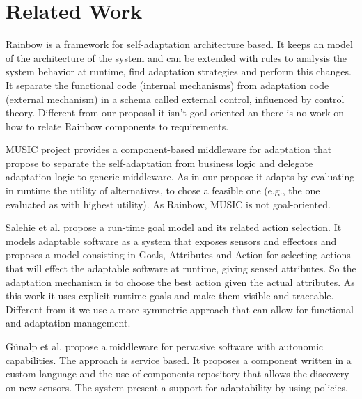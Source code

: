 \section{Related Work}
\label{related}


Rainbow is a framework for self-adaptation architecture based\cite{garlan_rainbow:_2004}. It keeps an model of the architecture of the system and can be extended with rules to analysis the system behavior at runtime, find adaptation strategies and perform this changes. It separate the functional code (internal mechanisms) from adaptation code (external mechanism) in a schema called external control, influenced by control theory. \cite{garlan_software_2009}
Different from our proposal it isn't goal-oriented an there is no work on how to relate Rainbow components to requirements.

MUSIC project provides a component-based middleware for adaptation that propose to separate the self-adaptation from business logic and delegate adaptation logic to generic middleware. As in our propose it adapts by evaluating in runtime the utility of alternatives, to chose a feasible one (e.g., the one evaluated as with highest utility)\cite{rouvoy_music:_2009}. As Rainbow, MUSIC is not goal-oriented.

Salehie et al. \cite{salehie_towards_2012} propose a run-time goal model and its related
action selection. It models adaptable software as a system that exposes sensors and effectors and  proposes a model consisting in Goals, Attributes and Action for selecting actions that will effect the adaptable software at runtime, giving sensed attributes.
So the adaptation mechanism is to choose the best action given the actual attributes.
As this work it uses explicit runtime goals and make them visible and traceable.
Different from it we use a more symmetric approach that can allow for functional
and adaptation management.

Günalp et al. \cite{gunalp_autonomic_2012} propose a middleware for pervasive software with autonomic capabilities. The approach is service based. It proposes a component written in a custom language and the use of components repository that allows the discovery on new sensors. The system present a support for adaptability by using policies.
